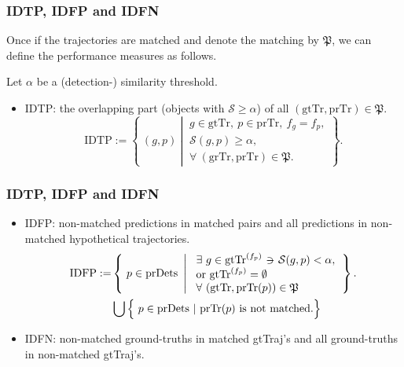 \documentclass[slidestop, mathserif]{beamer}
\newcommand{\suchthat}{-\hspace{-10pt}\ni\hspace{-10pt}-}
\begin{document}
\begin{frame}
    \frametitle{IDTP, IDFP and IDFN}

    Once if the trajectories are matched and denote the matching by $\mathfrak P$,
    we can define the performance measures as follows.

    \quad 

    Let $\alpha$ be a (detection-) similarity threshold.
    \begin{itemize}
    \item IDTP:
        the overlapping part (objects with $\mathcal S\geq \alpha$) of
        all $(\text{gtTr}, \text{prTr})\in\mathfrak P$.
        \[
            \text{IDTP} := 
                \left\{~(g,p)\ \left|\ 
                \begin{array}{l}
                g\in\text{gtTr},~ p\in\text{prTr},~ f_g = f_p, \\
                \mathcal S(g,p)\geq\alpha, \\
                \forall\ (\text{grTr}, \text{prTr})\in\mathfrak P.
                \end{array}
                \right.
                \right\}.
        \]
    \end{itemize}
    
\end{frame}

\begin{frame}
    \frametitle{IDTP, IDFP and IDFN}
    
    \begin{itemize}
    \item IDFP:
        non-matched predictions in matched pairs
        and all predictions in non-matched hypothetical trajectories.
        \begin{align*}
            \text{IDFP} := &
                \left\{~p \in \text{prDets}\ \left|\ 
                \begin{array}{l}
                \exists\ g\in\text{gtTr}^{(f_p)} ~ \suchthat ~
                \mathcal S(g,p) < \alpha, \\
                \text{or} ~ \text{gtTr}^{(f_p)} = \emptyset\ \\
                \forall\ (\text{gtTr}, \text{prTr}(p))\in\mathfrak P
                \end{array}
                \right.
                \right\}. \\
                & \bigcup \Big\{ ~p \in \text{prDets}\ |\ \text{{prTr}$(p)$ is not matched}.\Big\}
        \end{align*}
    \item IDFN:
        non-matched ground-truths in matched {gtTraj}'s and all ground-truths
        in non-matched {gtTraj}'s.
    \end{itemize}
\end{frame}
\end{document}
